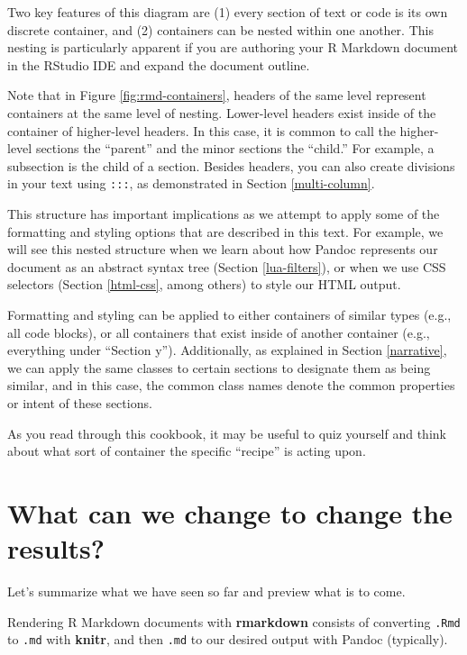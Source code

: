 \documentclass[
  11pt,
]{krantz}
\begin{document}
Two key features of this diagram are (1) every section of text or code is its own discrete container, and (2) containers can be nested within one another. This nesting is particularly apparent if you are authoring your R Markdown document in the RStudio IDE and expand the document outline.

Note that in Figure \ref{fig:rmd-containers}, headers of the same level represent containers at the same level of nesting. Lower-level headers exist inside of the container of higher-level headers. In this case, it is common to call the higher-level sections the ``parent'' and the minor sections the ``child.'' For example, a subsection is the child of a section. Besides headers, you can also create divisions in your text using \texttt{:::}, as demonstrated in Section \ref{multi-column}.

This structure has important implications as we attempt to apply some of the formatting and styling options that are described in this text. For example, we will see this nested structure when we learn about how Pandoc represents our document as an abstract syntax tree (Section \ref{lua-filters}), or when we use CSS selectors (Section \ref{html-css}, among others) to style our HTML output.

Formatting and styling can be applied to either containers of similar types (e.g., all code blocks), or all containers that exist inside of another container (e.g., everything under ``Section y''). Additionally, as explained in Section \ref{narrative}, we can apply the same classes to certain sections to designate them as being similar, and in this case, the common class names denote the common properties or intent of these sections.

As you read through this cookbook, it may be useful to quiz yourself and think about what sort of container the specific ``recipe'' is acting upon.

\hypertarget{what-to-change}{%
\section{What can we change to change the results?}\label{what-to-change}}

Let's summarize what we have seen so far and preview what is to come.

Rendering R Markdown documents with \textbf{rmarkdown} consists of converting \texttt{.Rmd} to \texttt{.md} with \textbf{knitr}, and then \texttt{.md} to our desired output with Pandoc (typically).
\end{document}
